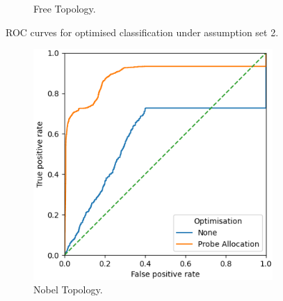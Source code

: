 \begin{figure}
\begin{subfigure}{0.475\textwidth}
        \caption{Free Topology.}
    \end{subfigure}
    \caption{ROC curves for optimised classification under assumption set 2.}
    \label{fig:RprobeoptA2ROCcurves}
\end{figure}

\noindent
\begin{figure}
    \centering
    \begin{subfigure}{0.475\textwidth}
        \includegraphics[width=\textwidth]{figs/results/nobel-germany_ac3_opt.png}
        \caption{Nobel Topology.}
    \end{subfigure}
    \begin{subfigure}{0.475\textwidth}

\end{subfigure}
\end{figure}
